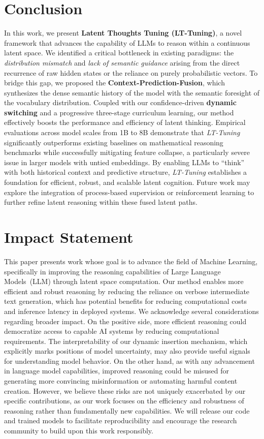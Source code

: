 \documentclass{article}
\theoremstyle{plain}
\theoremstyle{definition}
\theoremstyle{remark}
\begin{document}
\section{Conclusion}

In this work, we present \textbf{Latent Thoughts Tuning (LT-Tuning)}, a novel framework that advances the capability of LLMs to reason within a continuous latent space. We identified a critical bottleneck in existing paradigms: the \textit{distribution mismatch} and \textit{lack of semantic guidance} arising from the direct recurrence of raw hidden states or the reliance on purely probabilistic vectors. To bridge this gap, we proposed the \textbf{Context-Prediction-Fusion}, which synthesizes the dense semantic history of the model with the semantic foresight of the vocabulary distribution. Coupled with our confidence-driven \textbf{dynamic switching} and a progressive three-stage curriculum learning, our method effectively boosts the performance and efficiency of latent thinking. Empirical evaluations across model scales from 1B to 8B demonstrate that \textit{LT-Tuning} significantly outperforms existing baselines on mathematical reasoning benchmarks while successfully mitigating feature collapse, a particularly severe issue in larger models with untied embeddings. By enabling LLMs to ``think'' with both historical context and predictive structure, \textit{LT-Tuning} establishes a foundation for efficient, robust, and scalable latent cognition. Future work may explore the integration of process-based supervision or reinforcement learning to further refine latent reasoning within these fused latent paths.


\section*{Impact Statement}

This paper presents work whose goal is to advance the field of Machine Learning, specifically in improving the reasoning capabilities of Large Language Models~(LLM) through latent space computation. Our method enables more efficient and robust reasoning by reducing the reliance on verbose intermediate text generation, which has potential benefits for reducing computational costs and inference latency in deployed systems.
We acknowledge several considerations regarding broader impact. On the positive side, more efficient reasoning could democratize access to capable AI systems by reducing computational requirements. The interpretability of our dynamic insertion mechanism, which explicitly marks positions of model uncertainty, may also provide useful signals for understanding model behavior.
On the other hand, as with any advancement in language model capabilities, improved reasoning could be misused for generating more convincing misinformation or automating harmful content creation. However, we believe these risks are not uniquely exacerbated by our specific contributions, as our work focuses on the efficiency and robustness of reasoning rather than fundamentally new capabilities. We will release our code and trained models to facilitate reproducibility and encourage the research community to build upon this work responsibly.
\end{document}
